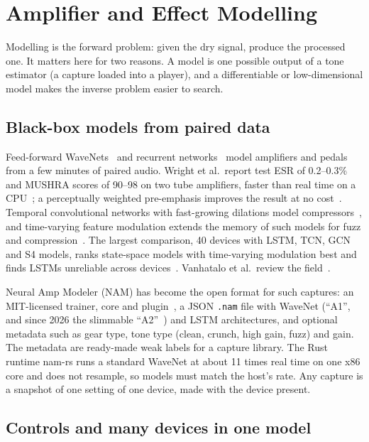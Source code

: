 \section{Amplifier and Effect Modelling}
\label{sec:modelling}

Modelling is the forward problem: given the dry signal, produce the processed
one. It matters here for two reasons. A model is one possible output of a tone
estimator (a capture loaded into a player), and a differentiable or
low-dimensional model makes the inverse problem easier to search.

\subsection{Black-box models from paired data}

Feed-forward WaveNets~\cite{damskagg2019deep,damskagg2019realtime} and
recurrent networks~\cite{wright2019realtime} model amplifiers and pedals from
a few minutes of paired audio. Wright et al.\ report test ESR of 0.2--0.3\%
and MUSHRA scores of 90--98 on two tube amplifiers, faster than real time on a
CPU~\cite{wright2020realtime}; a perceptually weighted pre-emphasis improves
the result at no cost~\cite{wright2020perceptual}. Temporal convolutional
networks with fast-growing dilations model compressors~\cite{steinmetz2022efficient},
and time-varying feature modulation extends the memory of such models for fuzz
and compression~\cite{comunita2023modelling}. The largest comparison, 40
devices with LSTM, TCN, GCN and S4 models, ranks state-space models with
time-varying modulation best and finds LSTMs unreliable across
devices~\cite{comunita2025differentiable}. Vanhatalo et al.\ review the
field~\cite{vanhatalo2022review}.

Neural Amp Modeler (NAM) has become the open format for such captures: an
MIT-licensed trainer, core and plugin~\cite{atkinsonndnam}, a JSON
\texttt{.nam} file with WaveNet (``A1'', and since 2026 the slimmable
``A2''~\cite{atkinson2025slimmable,atkinson2026a2}) and LSTM architectures,
and optional metadata such as gear type, tone type (clean, crunch, high gain,
fuzz) and gain. The metadata are ready-made weak labels for a capture library.
The Rust runtime nam-rs runs a standard WaveNet at about 11 times real time on
one x86 core and does not resample, so models must match the host's rate. Any
capture is a snapshot of one setting of one device, made with the device
present.

\subsection{Controls and many devices in one model}

